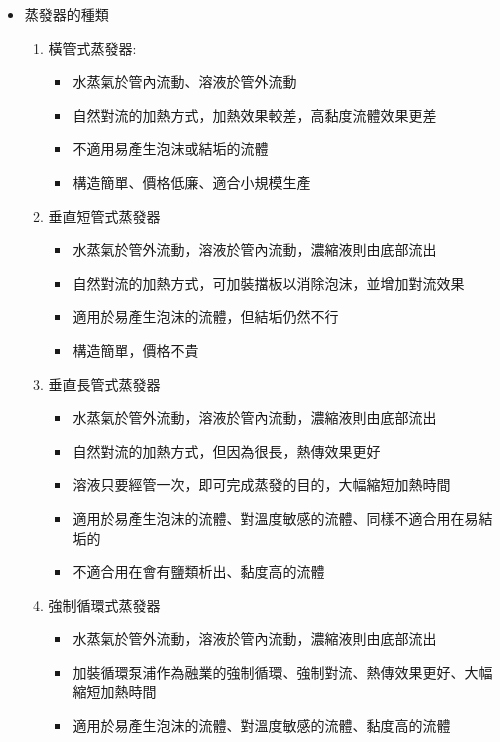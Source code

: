 \documentclass[../main.tex]{subfiles}
\begin{document}
\begin{itemize}
\begin{enumerate}
\begin{figure}[H]
      \caption{蒸發器產生泡沫與檔板示意圖}
    \end{figure}
    會使液體帶入蒸氣中，造成物料損失\\
    解決方法: 選擇適當的蒸發器種類、加裝擋板
  \end{enumerate}
  \item 蒸發器的種類
  \begin{enumerate}
    \item 橫管式蒸發器:
    \begin{itemize}
      \item 水蒸氣於管內流動、溶液於管外流動
      \item 自然對流的加熱方式，加熱效果較差，高黏度流體效果更差
      \item 不適用易產生泡沫或結垢的流體
      \item 構造簡單、價格低廉、適合小規模生產
    \end{itemize}
    \item 垂直短管式蒸發器
    \begin{itemize}
      \item 水蒸氣於管外流動，溶液於管內流動，濃縮液則由底部流出
      \item 自然對流的加熱方式，可加裝擋板以消除泡沫，並增加對流效果
      \item 適用於易產生泡沫的流體，但結垢仍然不行
      \item 構造簡單，價格不貴
    \end{itemize}
    \item 垂直長管式蒸發器
    \begin{itemize}
      \item 水蒸氣於管外流動，溶液於管內流動，濃縮液則由底部流出
      \item 自然對流的加熱方式，但因為很長，熱傳效果更好
      \item 溶液只要經管一次，即可完成蒸發的目的，大幅縮短加熱時間
      \item 適用於易產生泡沫的流體、對溫度敏感的流體、同樣不適合用在易結垢的
      \item 不適合用在會有鹽類析出、黏度高的流體
    \end{itemize}
    \item 強制循環式蒸發器
    \begin{itemize}
      \item 水蒸氣於管外流動，溶液於管內流動，濃縮液則由底部流出
      \item 加裝循環泵浦作為融業的強制循環、強制對流、熱傳效果更好、大幅縮短加熱時間
      \item 適用於易產生泡沫的流體、對溫度敏感的流體、黏度高的流體

\end{itemize}
\end{enumerate}
\end{itemize}
\end{document}
